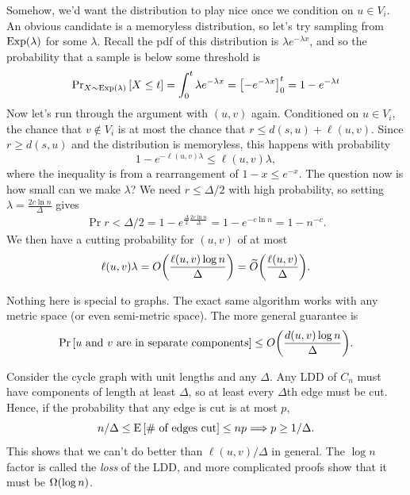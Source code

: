 \documentclass[12pt]{article}
\begin{document}
Somehow, we'd want the distribution to play nice once we condition on
$u \in V_i$. An obvious candidate is a memoryless distribution, so let's try
sampling from $\Exp{\lambda}$ for some $\lambda$. Recall the pdf of this
distribution is $\lambda e^{-\lambda x}$, and so the probability that a sample
is below some threshold is
\begin{align*}
  \Pr_{X \sim \Exp{\lambda}}{X \leq t} = \int_0^t \lambda e^{-\lambda x}
                                       = \brack{-e^{-\lambda x}}_0^t
                                       = 1 - e^{-\lambda t}
\end{align*}
Now let's run through the argument with $(u, v)$ again. Conditioned on
$u \in V_i$, the chance that $v \notin V_i$ is at most the chance that
$r \leq d(s, u) + \ell(u, v)$. Since $r \geq d(s, u)$ and the distribution is
memoryless, this happens with probability
\[
  1 - e^{-\ell(u, v)\lambda} \leq \ell(u, v)\lambda,
\]
where the inequality is from a rearrangement of $1 - x \leq e^{-x}$. The
question now is how small can we make $\lambda$? We need $r \leq \Delta/2$ with
high probability, so setting $\lambda = \frac{2c\ln n}{\Delta}$ gives
\begin{align*}
  \Pr{r < \Delta/2} = 1 - e^{\frac{\Delta}{2}\frac{2c\ln n}{\Delta}}
                    = 1 - e^{-c \ln n}
                    = 1 - n^{-c}.
\end{align*}
We then have a cutting probability for $(u, v)$ of at most
\[
  \ell(u, v)\lambda = \bigO{\frac{\ell(u, v)\log n}{\Delta}}
                    = \apxO{\frac{\ell(u, v)}{\Delta}}.
\]

\begin{remark}
  Nothing here is special to graphs. The exact same algorithm works with any
  metric space (or even semi-metric space). The more general guarantee is
  \[
    \Pr{\text{$u$ and $v$ are in separate components}} \leq \bigO{\frac{d(u,
          v)\log n}{\Delta}}.
  \]
\end{remark}

\begin{remark}
  Consider the cycle graph with unit lengths and any $\Delta$. Any LDD of $C_n$
  must have components of length at least $\Delta$, so at least every $\Delta$th
  edge must be cut. Hence, if the probability that any edge is cut is at most
  $p$,
  \[
    n/\Delta \leq            \text{E}\left[\text{\# of edges cut}\right]
             \leq            np
             \Longrightarrow p
             \geq            1/\Delta.
  \]
  This shows that we can't do better than $\ell(u, v)/\Delta$ in general. The
  $\log n$ factor is called the \emph{loss} of the LDD, and more complicated
  proofs show that it must be $\bigOmega{\log n}$.
\end{remark}
\end{document}
